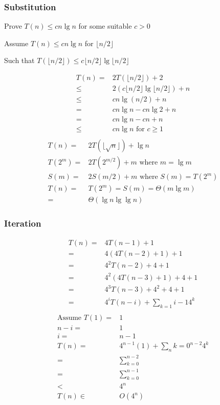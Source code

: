 \documentclass[10pt, a4paper,landscape]{article}
\begin{document}
\begin{multicols*}{4}

\subsubsection{Substitution}
\begin{compactitem}
    \item[Prove] $T(n) \leq cn \lg n$ for some suitable $c > 0$
    \item[Assume] $T(n) \leq cn \lg n$ for $\lfloor n / 2 \rfloor$
    \item[Such that] $T(\lfloor n / 2 \rfloor) \leq c \lfloor n / 2 \rfloor \lg \lfloor n / 2 \rfloor$
\end{compactitem}
\begin{align*}
T(n) =& 2T(\lfloor n / 2 \rfloor) + 2\\
     \leq& 2(c \lfloor n / 2 \rfloor \lg \lfloor n / 2 \rfloor) + n\\
     \leq& cn \lg(n /2) + n\\
     =& cn \lg n - cn \lg 2 + n\\
     =& cn \lg n - cn + n\\
     \leq&  cn \lg n \text{ for } c \geq 1\\
\end{align*}
\begin{align*}
    T(n) =& 2T(\lfloor \sqrt{n} \rfloor) + \lg n\\
    T(2^m) =& 2T(2^{m/2}) + m \text{ where } m = \lg m\\
    S(m) =& 2S(m / 2) + m \text{ where } S(m) = T(2^m)\\
    T(n) =& T(2^m) = S(m) = \Theta(m \lg m)\\
        =& \Theta(\lg n \lg \lg n)
\end{align*}

\subsubsection{Iteration}
\begin{align*}
T(n) =& 4T(n - 1) + 1\\
     =& 4(4T(n - 2) + 1) + 1\\
     =& 4^2T(n - 2) + 4 + 1\\
     =& 4^2(4T(n - 3) + 1) + 4 + 1\\
     =& 4^3T(n - 3) + 4^2 + 4 + 1\\
     =& 4^iT(n - i) + \sum_{k =1}{i - 1} 4^k\\
\end{align*}
\begin{align*}
\text{Assume } T(1) =& 1\\
n - i =& 1\\
    i =& n - 1\\
T(n) =& 4^{n - 1}(1) + \sum_n{k = 0}^{n -2} 4^k\\
     =& \sum_{k = 0}^{n - 2}\\
     =& \sum_{k = 0}^{n - 1}\\
     <& 4^n\\
T(n) \in& O(4^n)\\
\end{align*}


\end{multicols*}
\end{document}
